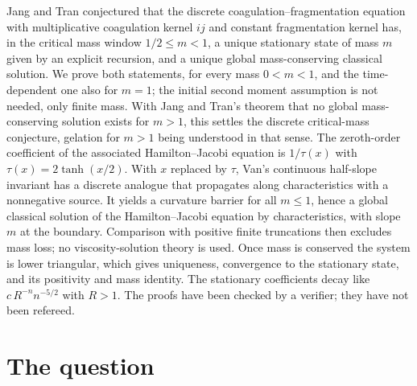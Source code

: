 \documentclass[11pt,a4paper]{report}
\begin{document}
\makepapertitle

\begin{paperabstract}
Jang and Tran conjectured that the discrete coagulation--fragmentation equation with multiplicative
coagulation kernel \(ij\) and constant fragmentation kernel has, in the critical mass window
\(1/2\le m<1\), a unique stationary state of mass \(m\) given by an explicit recursion, and a unique global
mass-conserving classical solution. We prove both statements, for every mass \(0<m<1\), and the
time-dependent one also for \(m=1\); the initial second moment assumption is not needed, only finite mass.
With Jang and Tran's theorem that no global mass-conserving solution exists for \(m>1\), this settles the
discrete critical-mass conjecture, gelation for \(m>1\) being understood in that sense.
The zeroth-order coefficient of the associated Hamilton--Jacobi equation is \(1/\tau(x)\) with
\(\tau(x)=2\tanh(x/2)\). With \(x\) replaced by \(\tau\), Van's continuous half-slope invariant has a discrete
analogue that propagates along characteristics with a nonnegative source. It yields a curvature barrier for
all \(m\le1\), hence a global classical solution of the Hamilton--Jacobi equation by characteristics, with
slope \(m\) at the boundary. Comparison with positive finite truncations then excludes mass loss; no
viscosity-solution theory is used. Once mass is conserved the system is lower triangular, which gives
uniqueness, convergence to the stationary state, and its positivity and mass identity. The stationary
coefficients decay like \(c\,R^{-n}n^{-5/2}\) with \(R>1\). The proofs have been checked by a verifier; they have not been refereed.
\end{paperabstract}

\section*{The question}
\end{document}
